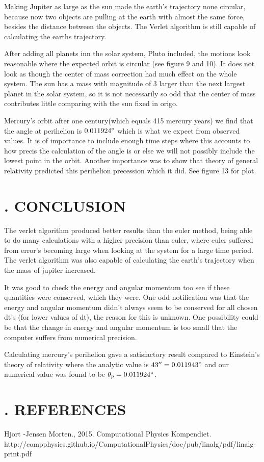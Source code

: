 \documentclass[twocolumn]{article}
\begin{document}
Making Jupiter as large as the sun made the earth's trajectory none circular, because now two objects are pulling at the earth with almost the same force, besides the distance between the objects. The Verlet algorithm is still capable of calculating the earths trajectory.  

After adding all planets inn the solar system, Pluto included, the motions look reasonable where the expected orbit is circular (see figure 9 and 10). It does not look as though the center of mass correction had much effect on the whole system. The sun has a mass with magnitude of 3 larger than the next largest planet in the solar system, so it is not necessarily so odd that the center of mass contributes little comparing with the sun fixed in origo.

Mercury's orbit after one century(which equals 415 mercury years) we find that the angle at perihelion is $0.011924 \degree$ which is what we expect from observed values. It is of importance to include enough time steps where this accounts to how precis the calculation of the angle is or else we will not possibly include the lowest point in the orbit. Another importance was to show that theory of general relativity predicted this perihelion precession which it did. See figure 13 for plot. 
\section*{. CONCLUSION}
The verlet algorithm produced better results than the euler method, being able to do many calculations with a higher precision than euler, where euler suffered from error's becoming large when looking at the system for a large time period. The verlet algorithm was also capable of calculating the earth's trajectory when the mass of jupiter increased.

It was good to check the energy and angular momentum too see if these quantities were conserved, which they were. One odd notification was that the energy and angular momentum didn't always seem to be conserved for all chosen dt's (for lower values of dt), the reason for this is unknown. One possibility could be that the change in energy and angular momentum is too small that the computer suffers from numerical precision. 

Calculating mercury's perihelion gave a satisfactory result compared to Einstein's theory of relativity where the analytic value is $43'' = 0.011943 \degree$ and our numerical value was found to be $\theta_p = 0.011924\degree$.
\newpage
\section*{. REFERENCES}
Hjort -Jensen Morten., 2015. Computational Physics Kompendiet. 
\newline
http://compphysics.github.io/ComputationalPhysics/doc/pub/linalg/pdf/linalg-print.pdf 
\end{document}
